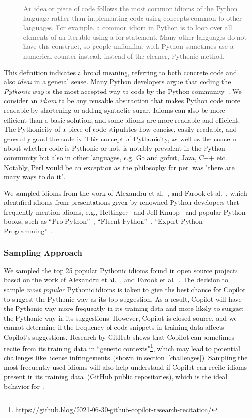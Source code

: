 \begin{quote}
    An idea or piece of code follows the most common idioms of the Python language rather than implementing code using concepts common to other languages. For example, a common idiom in Python is to loop over all elements of an iterable using a for statement. Many other languages do not have this construct, so people unfamiliar with Python sometimes use a numerical counter instead, instead of the cleaner, Pythonic method.
\end{quote}

This definition indicates a broad meaning, referring to both concrete code and also \emph{ideas} in a general sense. Many Python developers argue that coding the \emph{Pythonic way} is the most accepted way to code by the Python community~\cite{Alexandru2018}. 
We consider an \emph{idiom} to be any reusable abstraction that makes Python code more readable by shortening or adding syntactic sugar. Idioms can also be more efficient than a basic solution, and some idioms are more readable and efficient.
The Pythonicity of a piece of code stipulates how concise, easily readable, and generally good the code is. This concept of Pythonicity, as well as the concern about whether code is Pythonic or not, is notably prevalent in the Python community but also in other languages, e.g. Go and gofmt, Java, C++ etc. Notably, Perl would be an exception as the philosophy for perl was "there are many ways to do it".



We sampled idioms from the work of Alexandru et al.~\cite{Alexandru2018}, and Farook et al.~\cite{idioms}, which identified idioms from presentations given by renowned Python developers that frequently mention idioms, e.g., Hettinger~\cite{hettinger} and Jeff Knupp~\cite{knupp} and 
popular Python books, such as ``Pro Python''~\cite{Alchin2010}, ``Fluent Python''~\cite{fluent}, ``Expert Python Programming''~\cite{expert}.


\subsubsection{Sampling Approach}
\label{sampling}
We sampled the top 25 popular Pythonic idioms found in open source projects based on the work of Alexandru et al.~\cite{Alexandru2018}, and Farook et al.~\cite{idioms}.
The decision to sample \emph{most popular} Pythonic idioms is taken to give the best chance for Copilot to suggest the Pythonic way as its top suggestion. As a result, Copilot will have the Pythonic way more frequently in its training data and more likely to suggest the Pythonic way in its suggestions.
However, Copilot is closed source, and we cannot determine if the frequency of code snippets in training data affects Copilot's suggestions. Research by GitHub shows that Copilot can sometimes recite from its training data in ``generic contexts"\footnote{\url{https://github.blog/2021-06-30-github-copilot-research-recitation/}}, which may lead to potential challenges like license infringements~(shown in section~\ref{challenges}). 
Sampling the most frequently used idioms will also help understand if Copilot can recite idioms present in its training data~(GitHub public repositories), which is the ideal behavior for \cct{}.
